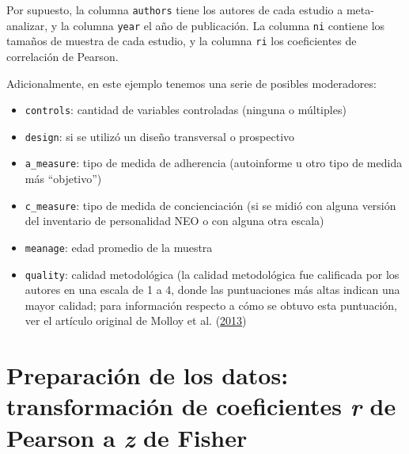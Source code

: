 \documentclass[
  bookmarksnumbered]{article}
\begin{document}
Por supuesto, la columna \texttt{authors} tiene los autores de cada estudio a meta-analizar, y la columna \texttt{year} el año de publicación. La columna \texttt{ni} contiene los tamaños de muestra de cada estudio, y la columna \texttt{ri} los coeficientes de correlación de Pearson.

Adicionalmente, en este ejemplo tenemos una serie de posibles moderadores:

\begin{itemize}
\item
  \texttt{controls}: cantidad de variables controladas (ninguna o múltiples)
\item
  \texttt{design}: si se utilizó un diseño transversal o prospectivo
\item
  \texttt{a\_measure}: tipo de medida de adherencia (autoinforme u otro tipo de medida más ``objetivo'')
\item
  \texttt{c\_measure}: tipo de medida de concienciación (si se midió con alguna versión del inventario de personalidad NEO o con alguna otra escala)
\item
  \texttt{meanage}: edad promedio de la muestra
\item
  \texttt{quality}: calidad metodológica (la calidad metodológica fue calificada por los autores en una escala de 1 a 4, donde las puntuaciones más altas indican una mayor calidad; para información respecto a cómo se obtuvo esta puntuación, ver el artículo original de Molloy et al. (\protect\hyperlink{ref-molloy2013}{2013})
\end{itemize}

\hypertarget{preparaciuxf3n-de-los-datos-transformaciuxf3n-de-coeficientes-r-de-pearson-a-z-de-fisher}{%
\section{\texorpdfstring{Preparación de los datos: transformación de coeficientes \emph{r} de Pearson a \emph{z} de Fisher}{Preparación de los datos: transformación de coeficientes r de Pearson a z de Fisher}}\label{preparaciuxf3n-de-los-datos-transformaciuxf3n-de-coeficientes-r-de-pearson-a-z-de-fisher}}
\end{document}
